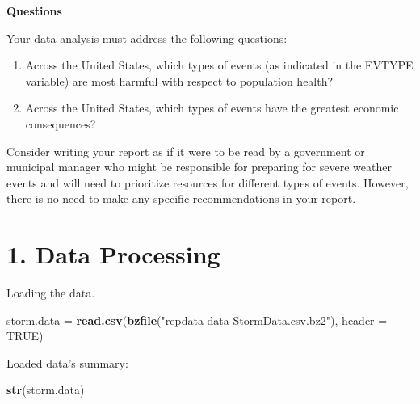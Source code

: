 \documentclass[]{article}
\newenvironment{Shaded}{\begin{snugshade}}{\end{snugshade}}
\newcommand{\KeywordTok}[1]{\textcolor[rgb]{0.13,0.29,0.53}{\textbf{{#1}}}}
\newcommand{\DataTypeTok}[1]{\textcolor[rgb]{0.13,0.29,0.53}{{#1}}}
\newcommand{\StringTok}[1]{\textcolor[rgb]{0.31,0.60,0.02}{{#1}}}
\newcommand{\OtherTok}[1]{\textcolor[rgb]{0.56,0.35,0.01}{{#1}}}
\newcommand{\NormalTok}[1]{{#1}}
\begin{document}
\textbf{Questions}

Your data analysis must address the following questions:

\begin{enumerate}
\def\labelenumi{\arabic{enumi}.}
\itemsep1pt\parskip0pt
\item
  Across the United States, which types of events (as indicated in the
  EVTYPE variable) are most harmful with respect to population health?
\item
  Across the United States, which types of events have the greatest
  economic consequences?
\end{enumerate}

Consider writing your report as if it were to be read by a government or
municipal manager who might be responsible for preparing for severe
weather events and will need to prioritize resources for different types
of events. However, there is no need to make any specific
recommendations in your report.

\section{1. Data Processing}\label{data-processing}

Loading the data.

\begin{Shaded}
\begin{Highlighting}[]
\NormalTok{storm.data =}\StringTok{ }\KeywordTok{read.csv}\NormalTok{(}\KeywordTok{bzfile}\NormalTok{(}\StringTok{"repdata-data-StormData.csv.bz2"}\NormalTok{), }\DataTypeTok{header =} \OtherTok{TRUE}\NormalTok{)}
\end{Highlighting}
\end{Shaded}

Loaded data's summary:

\begin{Shaded}
\begin{Highlighting}[]
\KeywordTok{str}\NormalTok{(storm.data)}
\end{Highlighting}
\end{Shaded}
\end{document}
